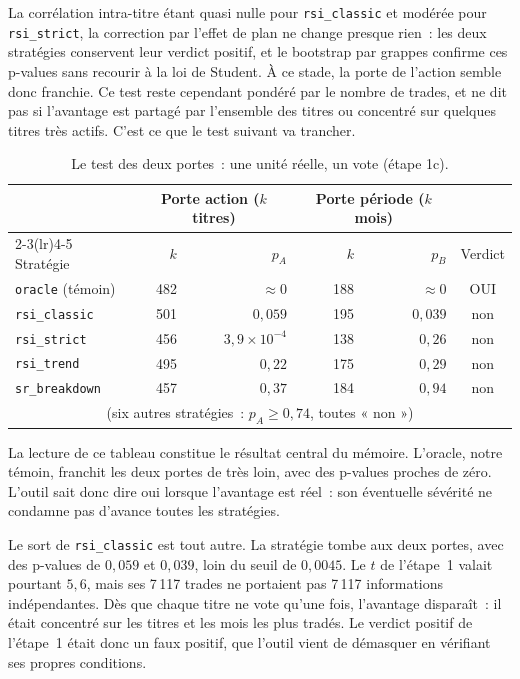 La corrélation intra-titre étant quasi nulle pour \texttt{rsi\_classic}
et modérée pour \texttt{rsi\_strict}, la correction par l'effet de plan
ne change presque rien~: les deux stratégies conservent leur verdict
positif, et le bootstrap par grappes confirme ces p-values sans recourir
à la loi de Student. À ce stade, la porte de l'action semble donc
franchie. Ce test reste cependant pondéré par le nombre de trades, et ne
dit pas si l'avantage est partagé par l'ensemble des titres ou concentré
sur quelques titres très actifs. C'est ce que le test suivant va
trancher.

\begin{table}[H]
\centering
\caption{Le test des deux portes~: une unité réelle, un vote (étape 1c).}
\label{tab:b1-dep-portes}
\small
\begin{tabular}{@{}lrrrrc@{}}
\toprule
 & \multicolumn{2}{c}{Porte action ($k$ titres)} & \multicolumn{2}{c}{Porte période ($k$ mois)} & \\
\cmidrule(lr){2-3}\cmidrule(lr){4-5}
Stratégie & $k$ & $p_A$ & $k$ & $p_B$ & Verdict \\
\midrule
\texttt{oracle} (témoin) & 482 & $\approx 0$          & 188 & $\approx 0$ & OUI \\
\midrule
\texttt{rsi\_classic}  & 501 & $0{,}059$            & 195 & $0{,}039$ & non \\
\texttt{rsi\_strict}   & 456 & $3{,}9\times10^{-4}$ & 138 & $0{,}26$  & non \\
\texttt{rsi\_trend}    & 495 & $0{,}22$             & 175 & $0{,}29$  & non \\
\texttt{sr\_breakdown} & 457 & $0{,}37$             & 184 & $0{,}94$  & non \\
\multicolumn{6}{c}{\footnotesize (six autres stratégies~: $p_A \ge 0{,}74$, toutes « non »)} \\
\bottomrule
\end{tabular}
\end{table}

La lecture de ce tableau constitue le résultat central du mémoire.
L'oracle, notre témoin, franchit les deux portes de très loin, avec des
p-values proches de zéro. L'outil sait donc dire oui lorsque l'avantage
est réel~: son éventuelle sévérité ne condamne pas d'avance toutes les
stratégies.

Le sort de \texttt{rsi\_classic} est tout autre. La stratégie tombe aux
deux portes, avec des p-values de $0{,}059$ et $0{,}039$, loin du seuil
de $0{,}0045$. Le \(t\) de l'étape~1 valait pourtant $5{,}6$, mais ses
7\,117 trades ne portaient pas 7\,117 informations indépendantes. Dès
que chaque titre ne vote qu'une fois, l'avantage disparaît~: il était
concentré sur les titres et les mois les plus tradés. Le verdict positif
de l'étape~1 était donc un faux positif, que l'outil vient de démasquer
en vérifiant ses propres conditions.

